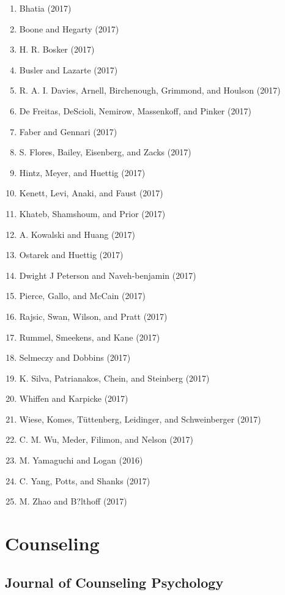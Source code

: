 \documentclass[english,man]{apa6}
\providecommand{\tightlist}{%
  \setlength{\itemsep}{0pt}\setlength{\parskip}{0pt}}
\theoremstyle{definition}
\theoremstyle{definition}
\theoremstyle{definition}
\theoremstyle{remark}
\begin{document}
\begin{enumerate}
\def\labelenumi{\arabic{enumi})}
\tightlist
\item
  Bhatia (2017)
\item
  Boone and Hegarty (2017)
\item
  H. R. Bosker (2017)
\item
  Busler and Lazarte (2017)
\item
  R. A. I. Davies, Arnell, Birchenough, Grimmond, and Houlson (2017)
\item
  De Freitas, DeScioli, Nemirow, Massenkoff, and Pinker (2017)
\item
  Faber and Gennari (2017)
\item
  S. Flores, Bailey, Eisenberg, and Zacks (2017)
\item
  Hintz, Meyer, and Huettig (2017)
\item
  Kenett, Levi, Anaki, and Faust (2017)
\item
  Khateb, Shamshoum, and Prior (2017)
\item
  A. Kowalski and Huang (2017)
\item
  Ostarek and Huettig (2017)
\item
  Dwight J Peterson and Naveh-benjamin (2017)
\item
  Pierce, Gallo, and McCain (2017)
\item
  Rajsic, Swan, Wilson, and Pratt (2017)
\item
  Rummel, Smeekens, and Kane (2017)
\item
  Selmeczy and Dobbins (2017)
\item
  K. Silva, Patrianakos, Chein, and Steinberg (2017)
\item
  Whiffen and Karpicke (2017)
\item
  Wiese, Komes, Tüttenberg, Leidinger, and Schweinberger (2017)
\item
  C. M. Wu, Meder, Filimon, and Nelson (2017)
\item
  M. Yamaguchi and Logan (2016)
\item
  C. Yang, Potts, and Shanks (2017)
\item
  M. Zhao and B?lthoff (2017)
\end{enumerate}

\section{Counseling}\label{counseling}

\subsection{Journal of Counseling
Psychology}\label{journal-of-counseling-psychology}
\end{document}
